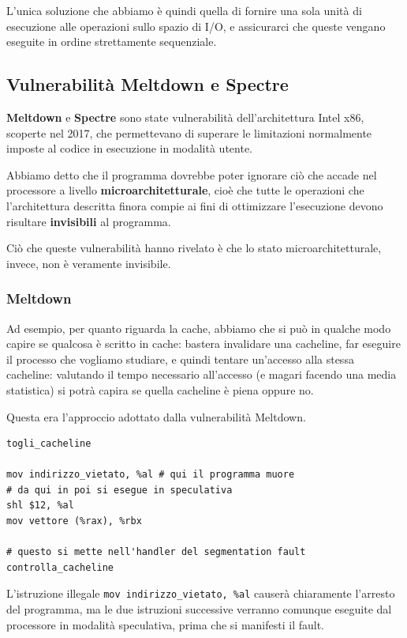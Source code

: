 \documentclass[a4paper,11pt]{article}
\begin{document}
L'unica soluzione che abbiamo è quindi quella di fornire una sola unità di esecuzione alle operazioni sullo spazio di I/O, e assicurarci che queste vengano eseguite in ordine strettamente sequenziale. 

\subsection{Vulnerabilità Meltdown e Spectre}
\textbf{Meltdown} e \textbf{Spectre} sono state vulnerabilità dell'architettura Intel x86, scoperte nel 2017, che permettevano di superare le limitazioni normalmente imposte al codice in esecuzione in modalità utente.

Abbiamo detto che il programma dovrebbe poter ignorare ciò che accade nel processore a livello \textbf{microarchitetturale}, cioè che tutte le operazioni che l'architettura descritta finora compie ai fini di ottimizzare l'esecuzione devono risultare \textbf{invisibili} al programma.

Ciò che queste vulnerabilità hanno rivelato è che lo stato microarchitetturale, invece, non è veramente invisibile.

\subsubsection{Meltdown}
Ad esempio, per quanto riguarda la cache, abbiamo che si può in qualche modo capire se qualcosa è scritto in cache: bastera invalidare una cacheline, far eseguire il processo che vogliamo studiare, e quindi tentare un'accesso alla stessa cacheline: valutando il tempo necessario all'accesso (e magari facendo una media statistica) si potrà capira se quella cacheline è piena oppure no.

Questa era l'approccio adottato dalla vulnerabilità Meltdown.
\begin{lstlisting}	
togli_cacheline

mov indirizzo_vietato, %al # qui il programma muore
# da qui in poi si esegue in speculativa
shl $12, %al
mov vettore (%rax), %rbx

# questo si mette nell'handler del segmentation fault
controlla_cacheline
\end{lstlisting}

L'istruzione illegale \lstinline|mov indirizzo_vietato, %al| causerà chiaramente l'arresto del programma, ma le due istruzioni successive verranno comunque eseguite dal processore in modalità speculativa, prima che si manifesti il fault.
\end{document}

